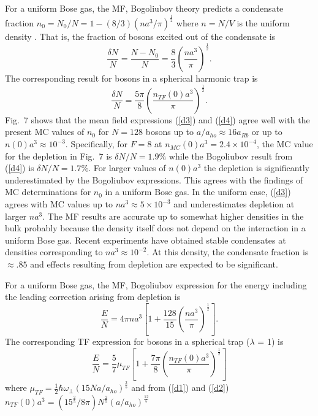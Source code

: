 \documentclass[aps,pra,twocolumn,groupedaddress]{revtex4}
\begin{document}
For a uniform Bose gas, the MF, Bogoliubov theory predicts a condensate
fraction $n_0 = N_0/N = 1- (8/3)(na^3/\pi)^{\frac{1}{2}}$ where $n=N/V$
is the uniform density \cite{bogoliubov47}. That is, the fraction of bosons 
excited out of the condensate is
\begin{equation}
\frac{\delta N}{N} = \frac{N-N_0}{N} = 
\frac{8}{3}(\frac{na^3}{\pi})^{\frac{1}{2}}
\label{d3}.
\end{equation}
The corresponding result for bosons in a spherical harmonic trap is 
\cite{dalfovo99}
\begin{equation}
\frac{\delta N}{N} = \frac{5\pi}{8}(\frac{n_{TF}(0)a^3}{\pi})^{\frac{1}{2}}
\label{d4}.
\end{equation}
Fig.~7 shows that the mean field expressions (\ref{d3}) and (\ref{d4}) 
agree well with the 
present MC values of $n_0$ for $N=128$ bosons up to $a/a_{ho} \approx 16a_{Rb}$
or up to $n(0)a^3\approx 10^{-3}$.
Specifically, for $F=8$ at $n_{MC}(0)a^3 = 2.4 \times 10^{-4}$, the MC value for
the depletion in Fig.~7 is $\delta N/N = 1.9 \%$ while the Bogoliubov result 
from (\ref{d4}) is $\delta N/N = 1.7\%$.
For larger values of $n(0)a^3$ the depletion
is significantly underestimated by the Bogoliubov expressions.  This agrees
with the findings of MC determinations for $n_0$ in a uniform Bose gas\cite{giorgini}.
In the uniform case, (\ref{d3}) agrees with MC values up to 
$na^3 \approx 5\times 10^{-3}$ and
underestimates depletion at larger $na^3$.  The MF results are
accurate up to somewhat higher densities in the bulk probably because the density itself
does not depend on the interaction in a uniform Bose gas.  Recent experiments 
\cite{cornish00} have obtained stable condensates at 
densities corresponding to $na^3 \approx 10^{-2}$.  At this density, the condensate
fraction is $\approx .85$ and effects resulting from depletion are expected to be
significant. 

For a uniform Bose gas, the MF, Bogoliubov expression for the energy including
the leading correction arising from depletion is 
\cite{bogoliubov47}
\begin{equation}
\frac{E}{N} = 4\pi na^3[1+ \frac{128}{15}(\frac{na^3}{\pi})^{\frac{1}{2}}]
\label{d5}.
\end{equation}
The corresponding TF expression for bosons in a spherical trap ($\lambda$ = 1) is 
\cite{dalfovo99}
\begin{equation}
\frac{E}{N}=\frac{5}{7}\mu_{TF}[1+\frac{7\pi}{8}(\frac{n_{TF}(0)a^3}{\pi})
^{\frac{1}{2}}]
\label{d6}
\end{equation}
where $\mu_{TF} = \frac{1}{2}\hbar\omega_{\perp}
(15Na/a_{ho})^{\frac{2}{5}}$ 
and from (\ref{d1}) and (\ref{d2}) 
$n_{TF}(0)a^3=(15^{\frac{2}{5} }/8\pi)N^{\frac{2}{5} }(a/a_{ho})^{\frac{12}{5} }$
\end{document}
